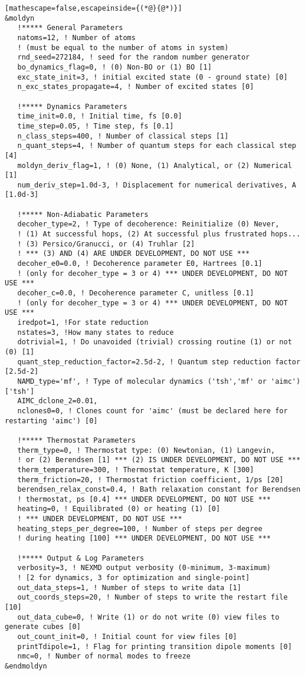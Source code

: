 \begin{lstlisting}[mathescape=false,escapeinside={(*@}{@*)}]
&moldyn
   !***** General Parameters
   natoms=12, ! Number of atoms
   ! (must be equal to the number of atoms in system)
   rnd_seed=272184, ! seed for the random number generator
   bo_dynamics_flag=0, ! (0) Non-BO or (1) BO [1]
   exc_state_init=3, ! initial excited state (0 - ground state) [0]
   n_exc_states_propagate=4, ! Number of excited states [0]

   !***** Dynamics Parameters
   time_init=0.0, ! Initial time, fs [0.0]
   time_step=0.05, ! Time step, fs [0.1]
   n_class_steps=400, ! Number of classical steps [1]
   n_quant_steps=4, ! Number of quantum steps for each classical step [4]
   moldyn_deriv_flag=1, ! (0) None, (1) Analytical, or (2) Numerical [1]
   num_deriv_step=1.0d-3, ! Displacement for numerical derivatives, A [1.0d-3]

   !***** Non-Adiabatic Parameters
   decoher_type=2, ! Type of decoherence: Reinitialize (0) Never,
   ! (1) At successful hops, (2) At successful plus frustrated hops...
   ! (3) Persico/Granucci, or (4) Truhlar [2]
   ! *** (3) AND (4) ARE UNDER DEVELOPMENT, DO NOT USE ***
   decoher_e0=0.0, ! Decoherence parameter E0, Hartrees [0.1]
   ! (only for decoher_type = 3 or 4) *** UNDER DEVELOPMENT, DO NOT USE ***
   decoher_c=0.0, ! Decoherence parameter C, unitless [0.1]
   ! (only for decoher_type = 3 or 4) *** UNDER DEVELOPMENT, DO NOT USE ***
   iredpot=1, !For state reduction
   nstates=3, !How many states to reduce
   dotrivial=1, ! Do unavoided (trivial) crossing routine (1) or not (0) [1]
   quant_step_reduction_factor=2.5d-2, ! Quantum step reduction factor [2.5d-2]
   NAMD_type='mf', ! Type of molecular dynamics ('tsh','mf' or 'aimc') ['tsh']
   AIMC_dclone_2=0.01,
   nclones0=0, ! Clones count for 'aimc' (must be declared here for restarting 'aimc') [0]

   !***** Thermostat Parameters
   therm_type=0, ! Thermostat type: (0) Newtonian, (1) Langevin,
   ! or (2) Berendsen [1] *** (2) IS UNDER DEVELOPMENT, DO NOT USE ***
   therm_temperature=300, ! Thermostat temperature, K [300]
   therm_friction=20, ! Thermostat friction coefficient, 1/ps [20]
   berendsen_relax_const=0.4, ! Bath relaxation constant for Berendsen
   ! thermostat, ps [0.4] *** UNDER DEVELOPMENT, DO NOT USE ***
   heating=0, ! Equilibrated (0) or heating (1) [0]
   ! *** UNDER DEVELOPMENT, DO NOT USE ***
   heating_steps_per_degree=100, ! Number of steps per degree
   ! during heating [100] *** UNDER DEVELOPMENT, DO NOT USE ***

   !***** Output & Log Parameters
   verbosity=3, ! NEXMD output verbosity (0-minimum, 3-maximum)
   ! [2 for dynamics, 3 for optimization and single-point]
   out_data_steps=1, ! Number of steps to write data [1]
   out_coords_steps=20, ! Number of steps to write the restart file [10]
   out_data_cube=0, ! Write (1) or do not write (0) view files to generate cubes [0]
   out_count_init=0, ! Initial count for view files [0]
   printTdipole=1, ! Flag for printing transition dipole moments [0]
   nmc=0, ! Number of normal modes to freeze
&endmoldyn


\end{lstlisting}
